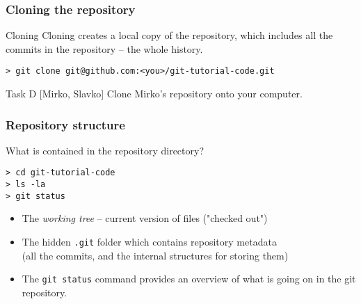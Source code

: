 
\begin{frame}[fragile]

\frametitle{Cloning the repository}

\begin{block}{Cloning}
Cloning creates a local copy of the repository, which includes all the commits in the repository -- the whole history.
\begin{verbatim}
> git clone git@github.com:<you>/git-tutorial-code.git
\end{verbatim}
\end{block}

\begin{block}{Task D [Mirko, Slavko]}
Clone Mirko's repository onto your computer.
\end{block}

	
\end{frame}


\begin{frame}[fragile]

\frametitle{Repository structure}

What is contained in the repository directory?
	
\begin{verbatim}
> cd git-tutorial-code
> ls -la
> git status
\end{verbatim}
	
\begin{itemize}
	\item The \textit{working tree} -- current version of files ("checked out")
	\item The hidden \texttt{.git} folder which contains repository metadata \\ (all the commits, and the internal structures for storing them)
	\item The \texttt{git status} command provides an overview of what is going on in the git repository.
\end{itemize}
\begin{verbatim}
\end{verbatim}
	
\end{frame}


